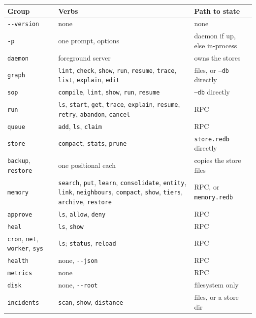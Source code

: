 \begin{longtable}{@{}>{\raggedright\arraybackslash}p{}>{\raggedright\arraybackslash}p{}>{\raggedright\arraybackslash}p{}@{}}
  \toprule
  \textbf{Group} & \textbf{Verbs} & \textbf{Path to state} \\
  \midrule
  \endhead
  \texttt{-{}-version} & none & none \\
  \texttt{-p} & one prompt, options & daemon if up, else in-process \\
  \texttt{daemon} & foreground server & owns the stores \\
  \texttt{graph} & \texttt{lint}, \texttt{check}, \texttt{show}, \texttt{run}, \texttt{resume}, \texttt{trace}, \texttt{list}, \texttt{explain}, \texttt{edit} & files, or \texttt{--db} directly \\
  \texttt{sop} & \texttt{compile}, \texttt{lint}, \texttt{show}, \texttt{run}, \texttt{resume} & \texttt{--db} directly \\
  \texttt{run} & \texttt{ls}, \texttt{start}, \texttt{get}, \texttt{trace}, \texttt{explain}, \texttt{resume}, \texttt{retry}, \texttt{abandon}, \texttt{cancel} & RPC \\
  \texttt{queue} & \texttt{add}, \texttt{ls}, \texttt{claim} & RPC \\
  \texttt{store} & \texttt{compact}, \texttt{stats}, \texttt{prune} & \texttt{store.redb} directly \\
  \texttt{backup}, \texttt{restore} & one positional each & copies the store files \\
  \texttt{memory} & \texttt{search}, \texttt{put}, \texttt{learn}, \texttt{consolidate}, \texttt{entity}, \texttt{link}, \texttt{neighbours}, \texttt{compact}, \texttt{show}, \texttt{tiers}, \texttt{archive}, \texttt{restore} & RPC, or \texttt{memory.redb} \\
  \texttt{approve} & \texttt{ls}, \texttt{allow}, \texttt{deny} & RPC \\
  \texttt{heal} & \texttt{ls}, \texttt{show} & RPC \\
  \texttt{cron}, \texttt{net}, \texttt{worker}, \texttt{sys} & \texttt{ls}; \texttt{status}, \texttt{reload} & RPC \\
  \texttt{health} & none, \texttt{-{}-json} & RPC \\
  \texttt{metrics} & none & RPC \\
  \texttt{disk} & none, \texttt{-{}-root} & filesystem only \\
  \texttt{incidents} & \texttt{scan}, \texttt{show}, \texttt{distance} & files, or a store dir \\

\end{longtable}

